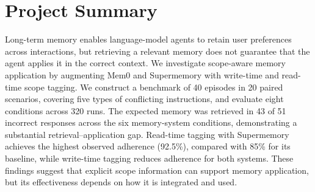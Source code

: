 \section*{Project Summary}

Long-term memory enables language-model agents to retain user
preferences across interactions, but retrieving a relevant memory
does not guarantee that the agent applies it in the correct context.
We investigate scope-aware memory application by augmenting Mem0
and Supermemory with write-time and read-time scope tagging.
We construct a benchmark of 40 episodes in 20 paired scenarios,
covering five types of conflicting instructions, and evaluate eight
conditions across 320 runs. The expected memory was retrieved in
43 of 51 incorrect responses across the six memory-system conditions,
demonstrating a substantial retrieval--application gap. Read-time
tagging with Supermemory achieves the highest observed adherence
(92.5\%), compared with 85\% for its baseline, while write-time
tagging reduces adherence for both systems. These findings suggest
that explicit scope information can support memory application,
but its effectiveness depends on how it is integrated and used.
